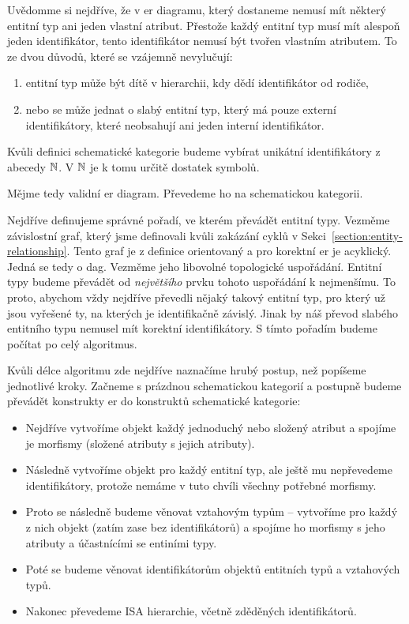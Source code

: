 Uvědomme si nejdříve, že v \acrshort{er} diagramu, který dostaneme nemusí mít některý entitní typ ani jeden vlastní atribut.
Přestože každý entitní typ musí mít alespoň jeden identifikátor, tento identifikátor nemusí být tvořen vlastním atributem.
To ze dvou důvodů, které se vzájemně nevylučují:
\begin{enumerate}
  \item entitní typ může být dítě v hierarchii, kdy dědí identifikátor od rodiče,
  \item nebo se může jednat o slabý entitní typ, který má pouze externí identifikátory, které neobsahují ani jeden interní identifikátor.
\end{enumerate}

Kvůli definici schematické kategorie budeme vybírat unikátní identifikátory z abecedy $\mathbb{N}$.
V $\mathbb{N}$ je k tomu určitě dostatek symbolů.

Mějme tedy validní \acrshort{er} diagram.
Převedeme ho na schematickou kategorii.

Nejdříve definujeme správné pořadí, ve kterém převádět entitní typy.
Vezměme závislostní graf, který jsme definovali kvůli zakázání cyklů v Sekci~\ref{section:entity-relationship}.
Tento graf je z definice orientovaný a pro korektní \acrshort{er} je acyklický.
Jedná se tedy o \acrshort{dag}.
Vezměme jeho libovolné topologické uspořádání.
Entitní typy budeme převádět od \emph{největšího} prvku tohoto uspořádání k nejmenšímu.
To proto, abychom vždy nejdříve převedli nějaký takový entitní typ, pro který už jsou vyřešené ty, na kterých je identifikačně závislý.
Jinak by náš převod slabého entitního typu nemusel mít korektní identifikátory.
S tímto pořadím budeme počítat po celý algoritmus.

Kvůli délce algoritmu zde nejdříve naznačíme hrubý postup, než popíšeme jednotlivé kroky.
Začneme s prázdnou schematickou kategorií a postupně budeme převádět konstrukty \acrshort{er} do konstruktů schematické kategorie:
\begin{itemize}
  \item Nejdříve vytvoříme objekt každý jednoduchý nebo složený atribut a spojíme je morfismy (složené atributy s jejich atributy).
  \item Následně vytvoříme objekt pro každý entitní typ, ale ještě mu nepřevedeme identifikátory, protože nemáme v tuto chvíli všechny potřebné morfismy.
  \item Proto se následně budeme věnovat vztahovým typům -- vytvoříme pro každý z nich objekt (zatím zase bez identifikátorů) a spojíme ho morfismy s jeho atributy a účastnícími se entiními typy.
  \item Poté se budeme věnovat identifikátorům objektů entitních typů a vztahových typů.
  \item Nakonec převedeme ISA hierarchie, včetně zděděných identifikátorů.
\end{itemize}

